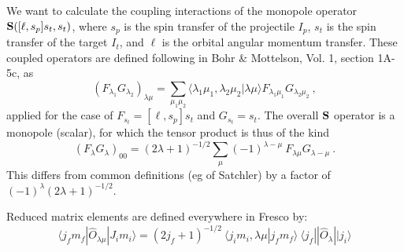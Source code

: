 \documentclass[11pt]{article}
\begin{document}
\bigskip

We want to calculate the coupling interactions of the monopole operator
$   {\bf S}([\ell,s_p]s_t,s_t)  $, where $s_p$ is the spin transfer of the
projectile $I_p$,  $s_t$ is the spin transfer of the
target $I_t$, and $\ell$ is the orbital angular momentum transfer.
These coupled operators are defined following in Bohr \& Mottelson, Vol.
1, section 1A-5c, as
\begin{equation}
(F_{\lambda_1} G_{\lambda_2})_{\lambda \mu}
  = \sum_{\mu_1 \mu_2} \langle \lambda_1 \mu_1 ,  \lambda_2 \mu_2
  |  \lambda \mu \rangle F_{\lambda_1\mu_1} G_{\lambda_2\mu_2} \ ,
\end{equation}
applied for the case of $F_{s_t} = [\ell,s_p]s_t$ and $ G_{s_t}=s_t$.
The overall ${\bf S}$ operator is a monopole (scalar), for which the tensor
product is thus of the kind
\begin{equation}
(F_{\lambda} G_{\lambda})_{00}
  = (2\lambda+1)^{-1/2} \sum_{\mu} (-1)^{\lambda-\mu} ~ F_{\lambda\mu}
  G_{\lambda-\mu} \ .
\end{equation}
This differs from common definitions (eg of Satchler) by a factor of
$ (-1)^\lambda (2\lambda+1)^{-1/2} $.

\bigskip

Reduced matrix elements are defined everywhere in {\sc Fresco} by:
\begin{equation}
\langle j_f m_f | \hat{O}_{\lambda \mu} | J_i m_i \rangle
 = (2j_f+1)^{-1/2} ~ \langle j_i m_i ,\lambda \mu | j_f m_f \rangle ~
\langle j_f || \hat{O}_\lambda || j_i\rangle
\end{equation}
\bigskip
\end{document}
